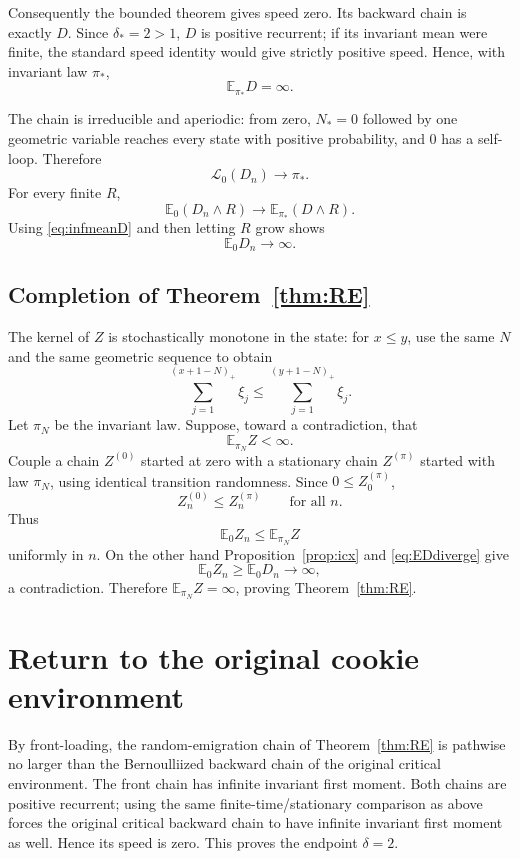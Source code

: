 \documentclass[11pt]{article}
\newcommand{\E}{\mathbb E}
\begin{document}
Consequently the bounded theorem gives speed zero.  Its backward chain is exactly $D$.  Since $\delta_*=2>1$, $D$ is positive recurrent; if its invariant mean were finite, the standard speed identity would give strictly positive speed.  Hence, with invariant law $\pi_*$,
\begin{equation}\label{eq:infmeanD}
 \E_{\pi_*}D=\infty.
\end{equation}

The chain is irreducible and aperiodic: from zero, $N_*=0$ followed by one geometric variable reaches every state with positive probability, and $0$ has a self-loop.  Therefore
\[
 \mathcal L_0(D_n)\longrightarrow\pi_*.
\]
For every finite $R$,
\[
 \E_0(D_n\wedge R)\longrightarrow\E_{\pi_*}(D\wedge R).
\]
Using \eqref{eq:infmeanD} and then letting $R$ grow shows
\begin{equation}\label{eq:EDdiverge}
 \E_0D_n\longrightarrow\infty.
\end{equation}

\subsection{Completion of Theorem~\ref{thm:RE}}

The kernel of $Z$ is stochastically monotone in the state: for $x\le y$, use the same $N$ and the same geometric sequence to obtain
\[
 \sum_{j=1}^{(x+1-N)_+}\xi_j
 \le
 \sum_{j=1}^{(y+1-N)_+}\xi_j.
\]
Let $\pi_N$ be the invariant law.  Suppose, toward a contradiction, that
\[
 \E_{\pi_N}Z<\infty.
\]
Couple a chain $Z^{(0)}$ started at zero with a stationary chain $Z^{(\pi)}$ started with law $\pi_N$, using identical transition randomness.  Since $0\le Z^{(\pi)}_0$,
\[
 Z_n^{(0)}\le Z_n^{(\pi)}\qquad\text{for all }n.
\]
Thus
\[
 \E_0 Z_n\le \E_{\pi_N}Z
\]
uniformly in $n$.  On the other hand Proposition~\ref{prop:icx} and \eqref{eq:EDdiverge} give
\[
 \E_0 Z_n\ge\E_0D_n\longrightarrow\infty,
\]
a contradiction.  Therefore $\E_{\pi_N}Z=\infty$, proving Theorem~\ref{thm:RE}.

\section{Return to the original cookie environment}

By front-loading, the random-emigration chain of Theorem~\ref{thm:RE} is pathwise no larger than the Bernoulliized backward chain of the original critical environment.  The front chain has infinite invariant first moment.  Both chains are positive recurrent; using the same finite-time/stationary comparison as above forces the original critical backward chain to have infinite invariant first moment as well.  Hence its speed is zero.  This proves the endpoint $\delta=2$.
\end{document}
